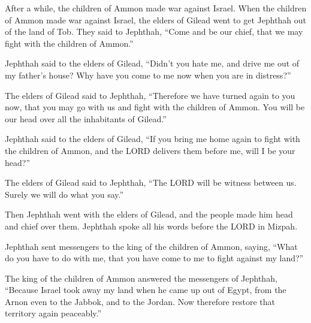 \myverse{}After a while, the children of Ammon made war against Israel.
\myverse{}When the children of Ammon made war against Israel, the elders of Gilead went
to get Jephthah out of the land of Tob.
\myverse{}They said to Jephthah, “Come and be our chief, that we may fight with the children
of Ammon.”

\myverse{}Jephthah said to the elders of Gilead, “Didn’t you hate me, and
drive me out of my father’s house? Why have you come to me now when you are in distress?”

\myverse{}The elders of Gilead said to Jephthah, “Therefore we have turned
again to you now, that you may go with us and fight with the children of Ammon. You will be our head over
all the inhabitants of Gilead.”

\myverse{}Jephthah said to the elders of Gilead, “If you bring me home again
to fight with the children of Ammon, and the LORD delivers them before me, will I be your head?”

\myverse{}The elders of Gilead said to Jephthah, “The LORD will be witness
between us. Surely we will do what you say.”

\myverse{}Then Jephthah went with the elders of Gilead, and the people
made him head and chief over them. Jephthah spoke all his words before the LORD in Mizpah.

\myverse{}Jephthah sent messengers to the king of the children of Ammon,
saying, “What do you have to do with me, that you have come to me to fight against my land?”

\myverse{}The king of the children of Ammon answered the messengers of
Jephthah, “Because Israel took away my land when he came up out of Egypt, from the Arnon even to the Jabbok,
and to the Jordan. Now therefore restore that territory again peaceably.”


